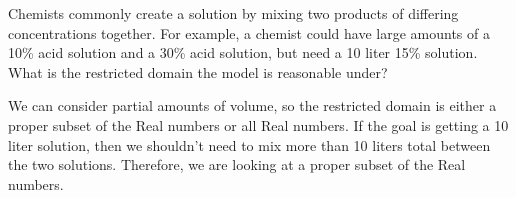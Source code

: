 \documentclass{ximera}
\begin{document}
\begin{question}
Chemists commonly create a solution by mixing two products of differing concentrations together. For example, a chemist could have large amounts of a 10\% acid solution and a 30\% acid solution, but need a 10 liter 15\% solution. What is the restricted domain the model is reasonable under?

\begin{multipleChoice}
\end{multipleChoice}

\begin{feedback}[correct]
We can consider partial amounts of volume, so the restricted domain is either a proper subset of the Real numbers or all Real numbers. If the goal is getting a 10 liter solution, then we shouldn't need to mix more than 10 liters total between the two solutions. Therefore, we are looking at a proper subset of the Real numbers. 
\end{feedback}

\end{question}
\end{document}
